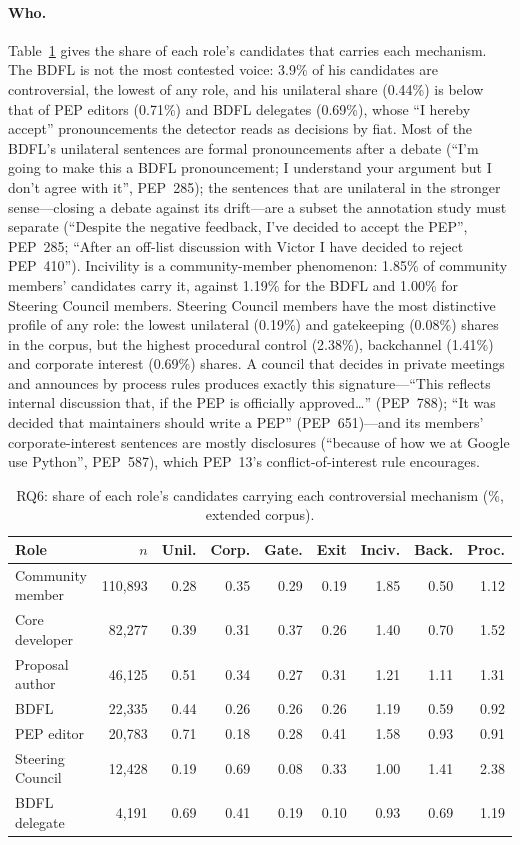 \documentclass[sigconf,screen]{acmart}
\begin{document}
\paragraph{Who.} Table~\ref{tab:rq6roles} gives the share of each role's candidates that carries each mechanism. The BDFL is not the most contested voice: 3.9\% of his candidates are controversial, the lowest of any role, and his unilateral share (0.44\%) is below that of PEP editors (0.71\%) and BDFL delegates (0.69\%), whose ``I hereby accept'' pronouncements the detector reads as decisions by fiat. Most of the BDFL's unilateral sentences are formal pronouncements after a debate (``I'm going to make this a BDFL pronouncement; I understand your argument but I don't agree with it'', PEP~285); the sentences that are unilateral in the stronger sense---closing a debate against its drift---are a subset the annotation study must separate (``Despite the negative feedback, I've decided to accept the PEP'', PEP~285; ``After an off-list discussion with Victor I have decided to reject PEP~410''). Incivility is a community-member phenomenon: 1.85\% of community members' candidates carry it, against 1.19\% for the BDFL and 1.00\% for Steering Council members. Steering Council members have the most distinctive profile of any role: the lowest unilateral (0.19\%) and gatekeeping (0.08\%) shares in the corpus, but the highest procedural control (2.38\%), backchannel (1.41\%) and corporate interest (0.69\%) shares. A council that decides in private meetings and announces by process rules produces exactly this signature---``This reflects internal discussion that, if the PEP is officially approved\ldots'' (PEP~788); ``It was decided that maintainers should write a PEP'' (PEP~651)---and its members' corporate-interest sentences are mostly disclosures (``because of how we at Google use Python'', PEP~587), which PEP~13's conflict-of-interest rule encourages.

\begin{table}[t]
\caption{RQ6: share of each role's candidates carrying each controversial mechanism (\%, extended corpus).}
\label{tab:rq6roles}
\footnotesize
\setlength{\tabcolsep}{3pt}
\begin{tabular}{lrrrrrrrr}
\toprule
Role & $n$ & Unil. & Corp. & Gate. & Exit & Inciv. & Back. & Proc. \\
\midrule
Community member & 110,893 & 0.28 & 0.35 & 0.29 & 0.19 & 1.85 & 0.50 & 1.12 \\
Core developer & 82,277 & 0.39 & 0.31 & 0.37 & 0.26 & 1.40 & 0.70 & 1.52 \\
Proposal author & 46,125 & 0.51 & 0.34 & 0.27 & 0.31 & 1.21 & 1.11 & 1.31 \\
BDFL & 22,335 & 0.44 & 0.26 & 0.26 & 0.26 & 1.19 & 0.59 & 0.92 \\
PEP editor & 20,783 & 0.71 & 0.18 & 0.28 & 0.41 & 1.58 & 0.93 & 0.91 \\
Steering Council & 12,428 & 0.19 & 0.69 & 0.08 & 0.33 & 1.00 & 1.41 & 2.38 \\
BDFL delegate & 4,191 & 0.69 & 0.41 & 0.19 & 0.10 & 0.93 & 0.69 & 1.19 \\
\bottomrule
\end{tabular}
\end{table}
\end{document}
